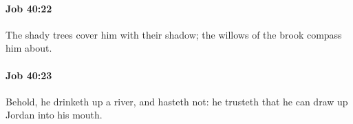 		\paragraph{Job 40:22} %
			\label{JOB-40-22}

			The shady trees cover him with their shadow; the willows of the brook compass him about.


		\paragraph{Job 40:23} %
			\label{JOB-40-23}

			Behold, he drinketh up a river, and hasteth not: he trusteth that he can draw up Jordan into his mouth.


